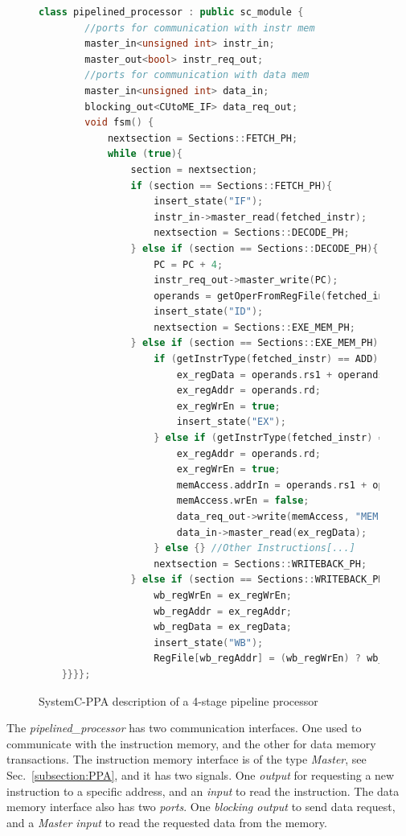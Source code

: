 \begin{figure}[htb!]
    \begin{lstlisting}[language=c++]
    class pipelined_processor : public sc_module {
        //ports for communication with instr mem
        master_in<unsigned int> instr_in;
        master_out<bool> instr_req_out;
        //ports for communication with data mem
        master_in<unsigned int> data_in;
        blocking_out<CUtoME_IF> data_req_out;
        void fsm() {
            nextsection = Sections::FETCH_PH;
            while (true){
                section = nextsection;
                if (section == Sections::FETCH_PH){
                    insert_state("IF");
                    instr_in->master_read(fetched_instr);
                    nextsection = Sections::DECODE_PH;
                } else if (section == Sections::DECODE_PH){
                    PC = PC + 4;
                    instr_req_out->master_write(PC);
                    operands = getOperFromRegFile(fetched_instr);
                    insert_state("ID");
                    nextsection = Sections::EXE_MEM_PH;
                } else if (section == Sections::EXE_MEM_PH) {
                    if (getInstrType(fetched_instr) == ADD) {
                        ex_regData = operands.rs1 + operands.rs2;
                        ex_regAddr = operands.rd;
                        ex_regWrEn = true;
                        insert_state("EX");
                    } else if (getInstrType(fetched_instr) == LOAD) {
                        ex_regAddr = operands.rd;
                        ex_regWrEn = true;
                        memAccess.addrIn = operands.rs1 + operands.imm; 
                        memAccess.wrEn = false;
                        data_req_out->write(memAccess, "MEM");
                        data_in->master_read(ex_regData);
                    } else {} //Other Instructions[...] 
                    nextsection = Sections::WRITEBACK_PH;
                } else if (section == Sections::WRITEBACK_PH) {
                    wb_regWrEn = ex_regWrEn;
                    wb_regAddr = ex_regAddr;
                    wb_regData = ex_regData;
                    insert_state("WB");
                    RegFile[wb_regAddr] = (wb_regWrEn) ? wb_regData : RegFile[wb_regAddr];
    }}}};\end{lstlisting}
    \caption{SystemC-PPA description of a 4-stage pipeline processor}
    \label{fig:sysc-pipe-proc}
\end{figure}

The \textit{pipelined\_processor} has two communication interfaces. One used to communicate with the instruction memory, and the other for data memory transactions. The instruction memory interface is of the type \textit{Master}, see Sec.~\ref{subsection:PPA}, and it has two signals. One \textit{output} for requesting a new instruction to a specific address, and an \textit{input} to read the instruction. The data memory interface also has two \textit{ports}. One \textit{blocking output} to send data request, and a \textit{Master input} to read the requested data from the memory.

